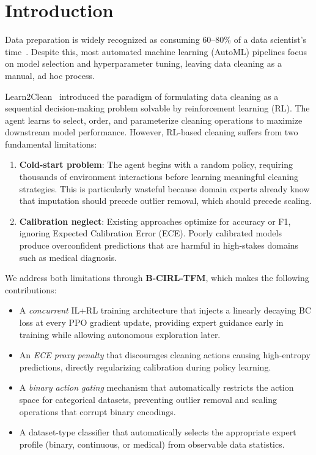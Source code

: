 \documentclass[conference]{IEEEtran}
\begin{document}
\section{Introduction}

Data preparation is widely recognized as consuming 60--80\% of a data
scientist's time~\cite{dasu2003exploratory}. Despite this, most automated
machine learning (AutoML) pipelines focus on model selection and
hyperparameter tuning, leaving data cleaning as a manual, ad hoc process.

Learn2Clean~\cite{berti2019learn2clean} introduced the paradigm of
formulating data cleaning as a sequential decision-making problem solvable
by reinforcement learning (RL). The agent learns to select, order, and
parameterize cleaning operations to maximize downstream model performance.
However, RL-based cleaning suffers from two fundamental limitations:

\begin{enumerate}
    \item \textbf{Cold-start problem}: The agent begins with a random policy,
    requiring thousands of environment interactions before learning meaningful
    cleaning strategies. This is particularly wasteful because domain
    experts already know that imputation should precede outlier removal,
    which should precede scaling.
    \item \textbf{Calibration neglect}: Existing approaches optimize for
    accuracy or F1, ignoring Expected Calibration Error (ECE). Poorly
    calibrated models produce overconfident predictions that are harmful
    in high-stakes domains such as medical diagnosis.
\end{enumerate}

We address both limitations through \textbf{B-CIRL-TFM}, which makes the
following contributions:

\begin{itemize}
    \item A \textit{concurrent} IL+RL training architecture that injects
    a linearly decaying BC loss at every PPO gradient update, providing
    expert guidance early in training while allowing autonomous exploration later.
    \item An \textit{ECE proxy penalty} that discourages cleaning actions
    causing high-entropy predictions, directly regularizing calibration
    during policy learning.
    \item A \textit{binary action gating} mechanism that automatically
    restricts the action space for categorical datasets, preventing outlier
    removal and scaling operations that corrupt binary encodings.
    \item A dataset-type classifier that automatically selects the
    appropriate expert profile (binary, continuous, or medical) from
    observable data statistics.
\end{itemize}
\end{document}

